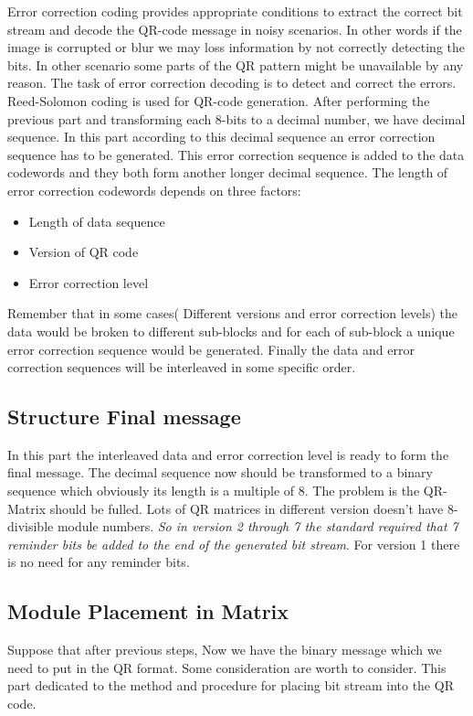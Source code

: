 Error correction coding provides appropriate conditions to extract the correct bit stream and decode the QR-code message in noisy scenarios. In other words if the image is corrupted or blur we may loss information by not correctly detecting the bits. In other scenario some parts of the QR pattern might be unavailable by any reason. The task of error correction decoding is to detect and correct the errors. Reed-Solomon coding is used for QR-code generation. After performing the previous part and transforming each 8-bits to a decimal number, we have decimal sequence. In this part according to this decimal sequence an error correction sequence has to be generated. This error correction sequence is added to the data codewords and they both form another longer decimal sequence. The length of error correction codewords depends on three factors:
\begin{itemize}
\item Length of data sequence
\item Version of QR code
\item Error correction level
\end{itemize}

Remember that in some cases( Different versions and error correction levels) the data would be broken to different sub-blocks and for each of sub-block a unique error correction sequence would be generated. Finally the data and error correction sequences will be interleaved in some specific order\cite{1iso}.

\subsection{Structure Final message}

In this part the interleaved data and error correction level is ready to form the final message. The decimal sequence now should be transformed to a binary sequence which obviously its length is a multiple of 8. The problem is the QR-Matrix should be fulled. Lots of QR matrices in different version doesn't have 8-divisible module numbers. \emph{So in version 2 through 7 the standard required that 7 reminder bits be added to the end of the generated bit stream}. For version 1 there is no need for any reminder bits.

\subsection{Module Placement in Matrix}

Suppose that after previous steps, Now we have the binary message which we need to put in the QR format. Some consideration are worth to consider. This part dedicated to the method and procedure for placing bit stream into the QR code\cite{Thonky}.

